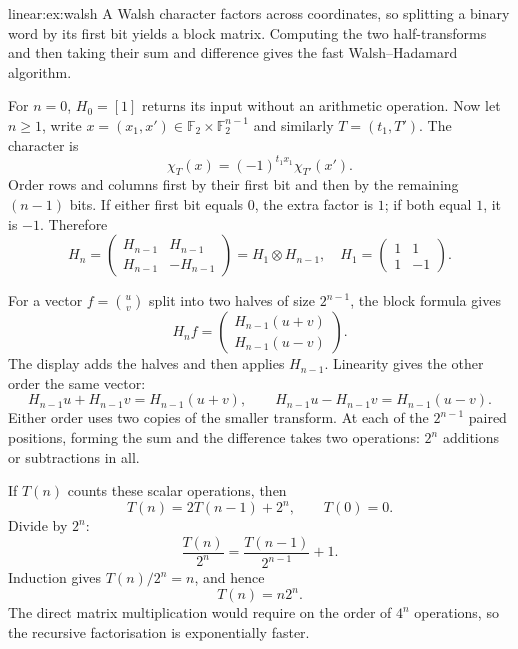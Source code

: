 \begin{solution}{linear:ex:walsh}
\idea A Walsh character factors across coordinates, so splitting a binary word by its first bit yields a block matrix. Computing the two half-transforms and then taking their sum and difference gives the fast Walsh--Hadamard algorithm.

\writeup For $n=0$, $H_0=[1]$ returns its input without an arithmetic operation.
Now let $n\ge1$, write $x=(x_1,x')\in\mathbb F_2\times\mathbb F_2^{n-1}$
and similarly $T=(t_1,T')$. The character is
\[
\chi_T(x)=(-1)^{t_1x_1}\chi_{T'}(x').
\]
Order rows and columns first by their first bit and then by the remaining $(n-1)$ bits. If either first bit equals $0$, the extra factor is $1$; if both equal $1$, it is $-1$. Therefore
\[
\boxed{H_n=
\begin{pmatrix}
H_{n-1}&H_{n-1}\\
H_{n-1}&-H_{n-1}
\end{pmatrix}
=H_1\otimes H_{n-1}},
\quad
H_1=\begin{pmatrix}1&1\\1&-1\end{pmatrix}.
\]

For a vector $f=\binom uv$ split into two halves of size $2^{n-1}$, the block formula gives
\[
H_nf=
\begin{pmatrix}H_{n-1}(u+v)\\H_{n-1}(u-v)\end{pmatrix}.
\]
The display adds the halves and then applies $H_{n-1}$. Linearity gives the other order the same vector:
\[
H_{n-1}u+H_{n-1}v=H_{n-1}(u+v),\qquad
H_{n-1}u-H_{n-1}v=H_{n-1}(u-v).
\]
Either order uses two copies of the smaller transform. At each of the $2^{n-1}$ paired positions, forming the sum and the difference takes two operations: $2^n$ additions or subtractions in all.

If $T(n)$ counts these scalar operations, then
\[
T(n)=2T(n-1)+2^n,\qquad T(0)=0.
\]
Divide by $2^n$:
\[
\frac{T(n)}{2^n}=\frac{T(n-1)}{2^{n-1}}+1.
\]
Induction gives $T(n)/2^n=n$, and hence
\[
\boxed{T(n)=n2^n}.
\]
The direct matrix multiplication would require on the order of $4^n$ operations, so the recursive factorisation is exponentially faster.
\end{solution}

